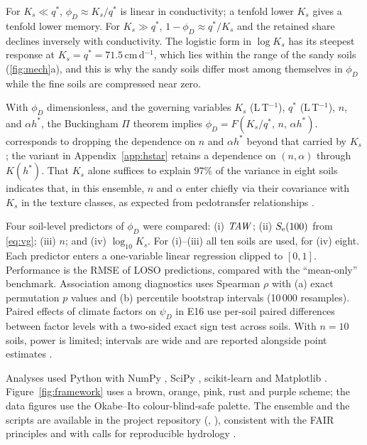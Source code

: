 For $K_s\ll q^\ast$, $\phi_D\approx K_s/q^\ast$ is linear in conductivity; a tenfold lower $K_s$ gives a tenfold lower memory. For $K_s\gg q^\ast$, $1-\phi_D\approx q^\ast/K_s$ and the retained share declines inversely with conductivity. The logistic form in $\log K_s$ has its steepest response at $K_s=q^\ast=71.5$\,cm\,d$^{-1}$, which lies within the range of the sandy soils (\cref{fig:mech}a), and this is why the sandy soils differ most among themselves in $\phi_D$ while the fine soils are compressed near zero.

With $\phi_D$ dimensionless, and the governing variables $K_s$ (L\,T$^{-1}$), $q^\ast$ (L\,T$^{-1}$), $n$, and $\alpha h^\ast$, the Buckingham $\Pi$ theorem \citep{Buckingham1914} implies $\phi_D=F(K_s/q^\ast,\,n,\,\alpha h^\ast)$.  corresponds to dropping the dependence on $n$ and $\alpha h^\ast$ beyond that carried by $K_s$; the variant in Appendix~\ref{app:hstar} retains a dependence on $(n,\alpha)$ through $K(h^\ast)$. That $K_s$ alone suffices to explain $97\%$ of the variance in eight soils indicates that, in this ensemble, $n$ and $\alpha$ enter chiefly via their covariance with $K_s$ in the texture classes, as expected from pedotransfer relationships \citep{Schaap2001,Saxton2006}.

Four soil-level predictors of $\phi_D$ were compared: (i) $\mathit{TAW}$; (ii) $S_{\mathrm{e}}(100)$ from \cref{eq:vg}; (iii) $n$; and (iv) $\log_{10}K_s$. For (i)--(iii) all ten soils are used, for (iv) eight. Each predictor enters a one-variable linear regression clipped to $[0,1]$. Performance is the RMSE of LOSO predictions, compared with the ``mean-only'' benchmark. Association among diagnostics uses Spearman $\rho$ with (a) exact permutation $p$ values and (b) percentile bootstrap intervals (10\,000 resamples). Paired effects of climate factors on $\psi_D$ in E16 use per-soil paired differences between factor levels with a two-sided exact sign test across soils. With $n=10$ soils, power is limited; intervals are wide and are reported alongside point estimates \citep{Efron1993,Good2005}.

Analyses used Python with NumPy \citep{Harris2020}, SciPy \citep{Virtanen2020}, scikit-learn \citep{Pedregosa2011} and Matplotlib \citep{Hunter2007}. Figure~\ref{fig:framework} uses a brown, orange, pink, rust and purple scheme; the data figures use the Okabe--Ito colour-blind-safe palette. The ensemble and the scripts are available in the project repository (\datalink, \codelink), consistent with the FAIR principles \citep{Wilkinson2016} and with calls for reproducible hydrology \citep{Hutton2016}.

